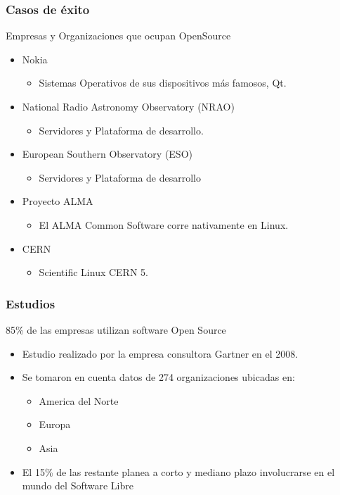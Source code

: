 \frame
{
\frametitle{Casos de éxito}
\Large{Empresas y Organizaciones  que ocupan OpenSource}
\normalsize
\begin{itemize}
	\item Nokia
	\begin{itemize}
		\item Sistemas Operativos de sus dispositivos más famosos, Qt.
	\end{itemize}
	\item National Radio Astronomy Observatory (NRAO)
	\begin{itemize}
		\item Servidores y Plataforma de desarrollo.
	\end{itemize}
	\item European Southern Observatory (ESO)
	\begin{itemize}
		\item Servidores y Plataforma de desarrollo
	\end{itemize}
	\item Proyecto ALMA
	\begin{itemize}
		\item El ALMA Common Software corre nativamente en Linux.
	\end{itemize}
	\item CERN
	\begin{itemize}
		\item Scientific Linux CERN 5.
	\end{itemize}
	
\end{itemize}
}
\frame
{
\frametitle{Estudios}
\Large{85\% de las empresas utilizan software Open Source}
\normalsize
\begin{itemize}
	\item Estudio realizado por la empresa consultora Gartner en el 2008.
	\item Se tomaron en cuenta datos de 274 organizaciones ubicadas en:
	\begin{itemize}
		\item America del Norte
		\item Europa
		\item Asia
	\end{itemize}
	\item El 15\% de las restante planea a corto y mediano plazo involucrarse en el mundo del Software Libre
\end{itemize}
}

